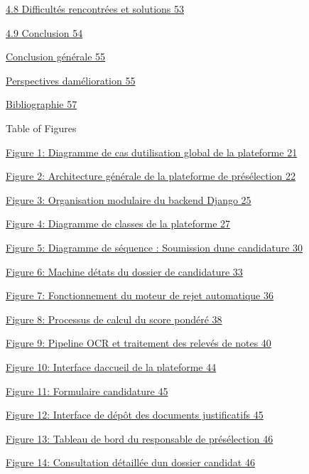 \documentclass[
]{article}
\begin{document}
\protect\hyperlink{difficultuxe9s-rencontruxe9es-et-solutions}{4.8
Difficultés rencontrées et solutions 53}

\protect\hyperlink{conclusion-3}{4.9 Conclusion 54}

\protect\hyperlink{conclusion-guxe9nuxe9rale}{Conclusion générale 55}

\protect\hyperlink{perspectives-damuxe9lioration}{Perspectives
d\textquotesingle amélioration 55}

\protect\hyperlink{bibliographie}{Bibliographie 57}

Table of Figures

\protect\hyperlink{Figureux210ux7csequence}{Figure 1: Diagramme de cas
d\textquotesingle utilisation global de la plateforme 21}

\protect\hyperlink{Figureux211ux7csequence}{Figure 2: Architecture
générale de la plateforme de présélection 22}

\protect\hyperlink{Figureux212ux7csequence}{Figure 3: Organisation
modulaire du backend Django 25}

\protect\hyperlink{Figureux213ux7csequence}{Figure 4: Diagramme de
classes de la plateforme 27}

\protect\hyperlink{Figureux214ux7csequence}{Figure 5: Diagramme de
séquence : Soumission d\textquotesingle une candidature 30}

\protect\hyperlink{Figureux215ux7csequence}{Figure 6: Machine
d\textquotesingle états du dossier de candidature 33}

\protect\hyperlink{Figureux216ux7csequence}{Figure 7: Fonctionnement du
moteur de rejet automatique 36}

\protect\hyperlink{Figureux217ux7csequence}{Figure 8: Processus de
calcul du score pondéré 38}

\protect\hyperlink{Figureux218ux7csequence}{Figure 9: Pipeline OCR et
traitement des relevés de notes 40}

\protect\hyperlink{Figureux219ux7csequence}{Figure 10: Interface
d\textquotesingle accueil de la plateforme 44}

\protect\hyperlink{Figureux2110ux7csequence}{Figure 11: Formulaire
candidature 45}

\protect\hyperlink{Figureux2111ux7csequence}{Figure 12: Interface de
dépôt des documents justificatifs 45}

\protect\hyperlink{Figureux2112ux7csequence}{Figure 13: Tableau de bord
du responsable de présélection 46}

\protect\hyperlink{Figureux2113ux7csequence}{Figure 14: Consultation
détaillée d\textquotesingle un dossier candidat 46}
\end{document}
